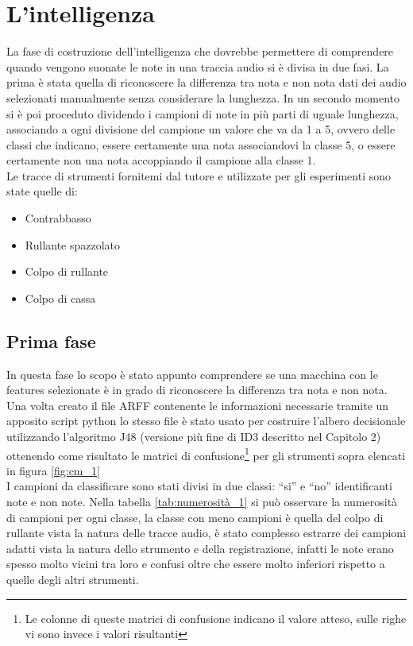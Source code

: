 \chapter{L'intelligenza}
La fase di costruzione dell'intelligenza che dovrebbe permettere di comprendere quando vengono suonate le note in una traccia audio si è divisa in due fasi. La prima è stata quella di riconoscere la differenza tra nota e non nota dati dei audio selezionati manualmente senza considerare la lunghezza. In un secondo momento si è poi proceduto dividendo i campioni di note in più parti di uguale lunghezza, associando a ogni divisione del campione un valore che va da 1 a 5, ovvero delle classi che indicano, essere certamente una nota associandovi la classe 5, o essere certamente non una nota accoppiando il campione alla classe 1.\\
Le tracce di strumenti fornitemi dal tutore e utilizzate per gli esperimenti sono state quelle di: 
\begin{itemize}
	\item Contrabbasso
	\item Rullante spazzolato
	\item Colpo di rullante
	\item Colpo di cassa
\end{itemize}


\section{Prima fase}
In questa fase lo scopo è stato appunto comprendere se una macchina con le features selezionate è in grado di riconoscere la differenza tra nota e non nota. Una volta creato il file ARFF contenente le informazioni necessarie tramite un apposito script python lo stesso file è stato usato per costruire l'albero decisionale utilizzando l'algoritmo J48 (versione più fine di ID3 descritto nel Capitolo 2) ottenendo come risultato le matrici di confusione\footnote{Le colonne di queste matrici di confusione indicano il valore atteso, sulle righe vi sono invece i valori risultanti} per gli strumenti sopra elencati in figura \ref{fig:cm_1}\\

I campioni da classificare sono stati divisi in due classi: ``si'' e ``no'' identificanti note e non note. Nella tabella \ref{tab:numerosità_1} si può osservare la numerosità di campioni per ogni classe, la classe con meno campioni è quella del colpo di rullante vista la natura delle tracce audio, è stato complesso estrarre dei campioni adatti vista la natura dello strumento e della registrazione, infatti le note erano spesso molto vicini tra loro e confusi oltre che essere molto inferiori rispetto a quelle degli altri strumenti.

